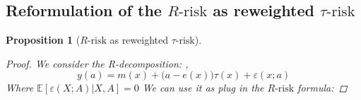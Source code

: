 \documentclass[unnumsec,webpdf,contemporary,large]{oup-authoring-template}%
\theoremstyle{thmstyleone}%
\theoremstyle{thmstyletwo}%
\theoremstyle{thmstylethree}%
\newtheorem{proposition*}{Proposition}
\begin{document}
\begin{appendices}



    \subsection{Reformulation of the $R\text{-risk}$ as reweighted
        $\tau\text{-risk}$}\label{apd:proofs:r_risk_rewrite}

    \begin{proposition*}[$R\text{-risk}$ as reweighted $\tau
                \text{-risk}$]\label{apd:proofs:prop:r_risk_rewrite}

        \begin{proof}

            We consider the R-decomposition: \cite{robinson_rootnconsistent_1988},
            \begin{equation}\label{apd:eq:r_decomposition}
                y(a) = m(x) + \big( a - e(x) \big) \tau(x) + \varepsilon(x; a)
            \end{equation}
            Where $\mathbb E[\varepsilon(X; A)|X, A] = 0$ We can use it as plug in the
            $R\text{-risk}$ formula:


\end{proof}
\end{proposition*}
\end{appendices}
\end{document}
